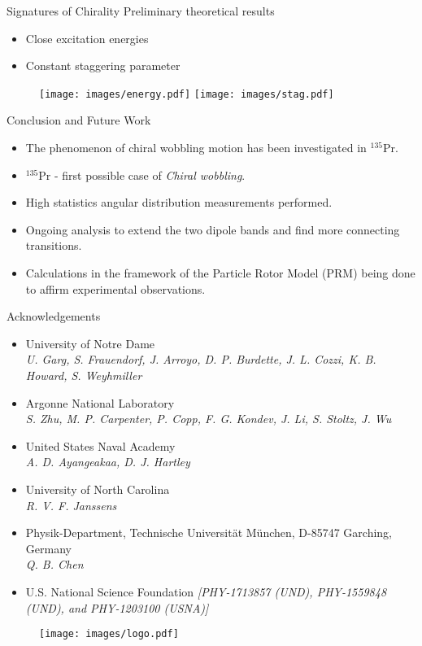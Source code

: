 \documentclass [aspectratio=169]{beamer}
\begin{document}
\begin{frame}{Signatures of Chirality}
Preliminary theoretical results
\begin{itemize}
\item{Close excitation energies}
\item{Constant staggering parameter}
\end{itemize}
\begin{figure}
\texttt{[image: images/energy.pdf]}
\texttt{[image: images/stag.pdf]}
\end{figure}
\end{frame}

\begin{frame}{Conclusion and Future Work}
\begin{itemize}
\item{The phenomenon of chiral wobbling motion has been investigated in $^{135}$Pr.}
\item{$^{135}$Pr - first possible case of \textit{Chiral wobbling}.}
\item{High statistics angular distribution measurements performed.}
\item{Ongoing analysis to extend the two dipole bands and find more connecting transitions.}
\item{Calculations in the framework of the Particle Rotor Model (PRM) being done to affirm experimental observations.}
\end{itemize}
\end{frame}


\begin{frame}{Acknowledgements}
\begin{multicols}{2}
\begin{itemize}
\item{\small{University of Notre Dame} \\
\textit{\scriptsize{\color{violet}U. Garg, S. Frauendorf, J. Arroyo, D. P. Burdette, J. L. Cozzi, K. B. Howard, S. Weyhmiller}}}
\item{\small{Argonne National Laboratory} \\
\textit{\scriptsize{\color{violet}S. Zhu, M. P. Carpenter, P. Copp, F. G. Kondev, J. Li, S. Stoltz, J. Wu}}}
\item{\small{United States Naval Academy} \\
\textit{\scriptsize{\color{violet}A. D. Ayangeakaa, D. J. Hartley}}}
\item{\small{University of North Carolina} \\
\textit{\scriptsize{\color{violet}R. V. F. Janssens}}}
\item{\small{Physik-Department, Technische Universit\"{a}t M\"{u}nchen, D-85747 Garching, Germany} \\
\textit{\scriptsize{\color{violet}Q. B. Chen}}}
\item{\small{U.S. National Science Foundation} \textit{\scriptsize{\color{violet}[PHY-1713857 (UND), PHY-1559848 (UND), and PHY-1203100 (USNA)]}}}
\end{itemize}
\begin{figure}
\texttt{[image: images/logo.pdf]}
\end{figure}
\end{multicols}
\end{frame}
\end{document}
